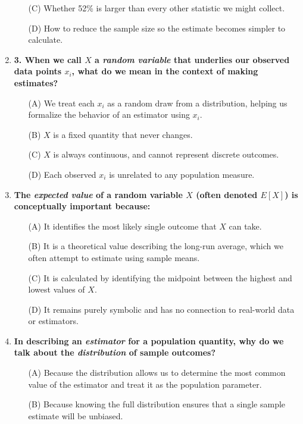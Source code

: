 \documentclass{article}
\begin{document}
\begin{enumerate}
\begin{enumerate}
        \item[(C)] Whether 52\% is larger than every other statistic we might collect.
        \item[(D)] How to reduce the sample size so the estimate becomes simpler to calculate.
        \end{enumerate}
    \item  \textbf{3. When we call $X$ a \emph{random variable} that underlies our observed data points $x_i$, what do we mean in the context of making estimates?}
        \begin{enumerate}
        \item[(A)] We treat each $x_i$ as a random draw from a distribution, helping us formalize the behavior of an estimator using $x_i$.
        \item[(B)] $X$ is a fixed quantity that never changes.
        \item[(C)] $X$ is always continuous, and cannot represent discrete outcomes.
        \item[(D)] Each observed $x_i$ is unrelated to any population measure.
        \end{enumerate}
    \item  \textbf{The \emph{expected value} of a random variable $X$ (often denoted $E[X]$) is conceptually important because:}
        \begin{enumerate}
        \item[(A)] It identifies the most likely single outcome that $X$ can take.
        \item[(B)] It is a theoretical value describing the long-run average, which we often attempt to estimate using sample means.
        \item[(C)] It is calculated by identifying the midpoint between the highest and lowest values of $X$.
        \item[(D)] It remains purely symbolic and has no connection to real-world data or estimators.
        \end{enumerate}
    \item  \textbf{In describing an \emph{estimator} for a population quantity, why do we talk about the \emph{distribution} of sample outcomes?}
        \begin{enumerate}
        \item[(A)] Because the distribution allows us to determine the most common value of the estimator and treat it as the population parameter.
        \item[(B)] Because knowing the full distribution ensures that a single sample estimate will be unbiased.

\end{enumerate}
\end{enumerate}
\end{document}
